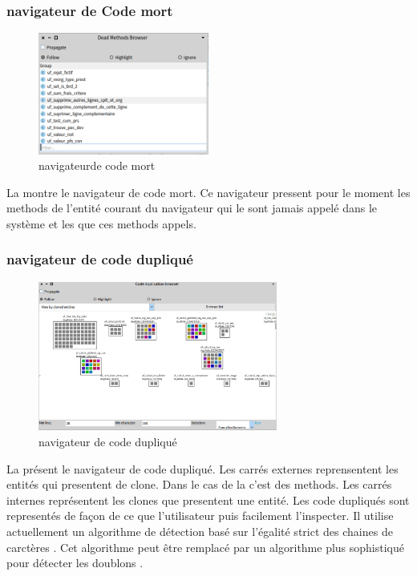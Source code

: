 \documentclass[a4paper]{article}
\begin{document}
\subsubsection{navigateur de Code mort}
\begin{figure}[htbp]
  \begin{center}
  \includegraphics[width=0.5\textwidth]{./figures/deadMethodBrowser.png}
  \caption{navigateurde code mort}
  \label{fig:deadMethodBrowser}
\end{center}
\vspace{-0.3cm}
\end{figure}
La  montre le navigateur de code mort.
Ce navigateur pressent pour le moment les methods de l'entité courant du navigateur qui le sont jamais appelé dans le système et les que ces methods appels.

\subsubsection{navigateur de code dupliqué}
\begin{figure}[htbp]
  \begin{center}
  \includegraphics[width=0.7\textwidth]{./figures/duplicationBrowser.png}
  \caption{navigateur de code dupliqué}
  \label{fig:duplicationBrowser}
\end{center}
\vspace{-0.3cm}
\end{figure}
La  présent le navigateur de code dupliqué. Les carrés externes reprensentent les entités qui presentent de clone.
Dans le cas de la  c'est des methods.  
Les carrés internes représentent les clones que presentent une entité.
Les code dupliqués sont representés de façon de ce que l'utilisateur puis facilement l'inspecter.
Il utilise actuellement un algorithme de détection basé sur l'égalité strict des chaines de carctères \citep{Duca99b}. 
Cet algorithme peut être remplacé par un algorithme plus sophistiqué pour détecter les doublons \citep{Roy07a}. 
\end{document}

